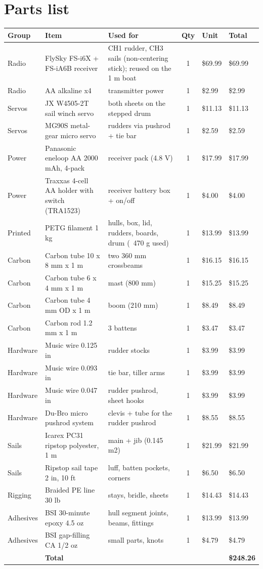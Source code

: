 \documentclass[11pt]{article}
\begin{document}
\section{Parts list}
{\small
\begin{longtable}{p{1.5cm}p{4.3cm}p{5.0cm}cp{1.2cm}p{1.2cm}}
\toprule
\textbf{Group} & \textbf{Item} & \textbf{Used for} & \textbf{Qty} & \textbf{Unit} & \textbf{Total} \\
\midrule\endhead
Radio & FlySky FS-i6X + FS-iA6B receiver & CH1 rudder, CH3 sails (non-centering stick); reused on the 1 m boat & 1 & \$69.99 & \$69.99 \\
Radio & AA alkaline x4 & transmitter power & 1 & \$2.99 & \$2.99 \\
Servos & JX W4505-2T sail winch servo & both sheets on the stepped drum & 1 & \$11.13 & \$11.13 \\
Servos & MG90S metal-gear micro servo & rudders via pushrod + tie bar & 1 & \$2.59 & \$2.59 \\
Power & Panasonic eneloop AA 2000 mAh, 4-pack & receiver pack (4.8 V) & 1 & \$17.99 & \$17.99 \\
Power & Traxxas 4-cell AA holder with switch (TRA1523) & receiver battery box + on/off & 1 & \$4.00 & \$4.00 \\
Printed & PETG filament 1 kg & hulls, box, lid, rudders, boards, drum (~470 g used) & 1 & \$13.99 & \$13.99 \\
Carbon & Carbon tube 10 x 8 mm x 1 m & two 360 mm crossbeams & 1 & \$16.15 & \$16.15 \\
Carbon & Carbon tube 6 x 4 mm x 1 m & mast (800 mm) & 1 & \$15.25 & \$15.25 \\
Carbon & Carbon tube 4 mm OD x 1 m & boom (210 mm) & 1 & \$8.49 & \$8.49 \\
Carbon & Carbon rod 1.2 mm x 1 m & 3 battens & 1 & \$3.47 & \$3.47 \\
Hardware & Music wire 0.125 in & rudder stocks & 1 & \$3.99 & \$3.99 \\
Hardware & Music wire 0.093 in & tie bar, tiller arms & 1 & \$3.99 & \$3.99 \\
Hardware & Music wire 0.047 in & rudder pushrod, sheet hooks & 1 & \$3.99 & \$3.99 \\
Hardware & Du-Bro micro pushrod system & clevis + tube for the rudder pushrod & 1 & \$8.55 & \$8.55 \\
Sails & Icarex PC31 ripstop polyester, 1 m & main + jib (0.145 m2) & 1 & \$21.99 & \$21.99 \\
Sails & Ripstop sail tape 2 in, 10 ft & luff, batten pockets, corners & 1 & \$6.50 & \$6.50 \\
Rigging & Braided PE line 30 lb & stays, bridle, sheets & 1 & \$14.43 & \$14.43 \\
Adhesives & BSI 30-minute epoxy 4.5 oz & hull segment joints, beams, fittings & 1 & \$13.99 & \$13.99 \\
Adhesives & BSI gap-filling CA 1/2 oz & small parts, knots & 1 & \$4.79 & \$4.79 \\
\midrule
& \textbf{Total} & & & & \textbf{\$248.26} \\
\bottomrule
\end{longtable}}
\end{document}
